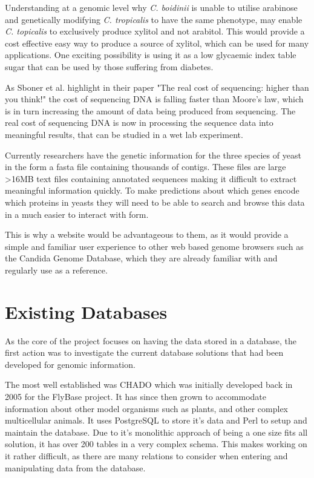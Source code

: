 Understanding at a genomic level why \textit{C. boidinii} is unable to utilise arabinose and genetically modifying \textit{C. tropicalis} to have the same phenotype, may enable \textit{C. topicalis} to exclusively produce xylitol and not arabitol. This would provide a cost effective easy way to produce a source of xylitol, which can be used for many applications. One exciting possibility is using it as a low glycaemic index table sugar that can be used by those suffering from diabetes.

As Sboner et al. highlight in their paper "The real cost of sequencing: higher than you think!"\cite{sequencingcost} the cost of sequencing DNA is falling faster than Moore's law, which is in turn increasing the amount of data being produced from sequencing. The real cost of sequencing DNA is now in processing the sequence data into meaningful results, that can be studied in a wet lab experiment. 

Currently researchers have the genetic information for the three species of yeast in the form a fasta file containing thousands of contigs. These files are large \textgreater 16MB text files containing annotated sequences making it difficult to extract meaningful information quickly. To make predictions about which genes encode which proteins in yeasts they will need to be able to search and browse this data in a much easier to interact with form. 

This is why a website would be advantageous to them, as it would provide a simple and familiar user experience to other web based genome browsers such as the Candida Genome Database\cite{cgd}, which they are already familiar with and regularly use as a reference. 

\section{Existing Databases}
As the core of the project focuses on having the data stored in a database, the first action was to investigate the current database solutions that had been developed for genomic information. 

The most well established was CHADO\cite{chado} which was initially developed back in 2005 for the FlyBase\cite{flybase} project. It has since then grown to accommodate information about other model organisms such as plants, and other complex multicellular animals. It uses PostgreSQL\cite{postgres} to store it's data and Perl\cite{perl} to setup and maintain the database. Due to it's monolithic approach of being a one size fits all solution, it has over 200 tables in a very complex schema. This makes working on it rather difficult, as there are many relations to consider when entering and manipulating data from the database.

